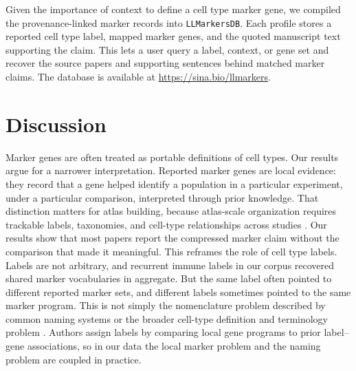 \documentclass[10pt,twocolumn]{article}
\theoremstyle{plain}
\theoremstyle{definition}
\theoremstyle{remark}
\begin{document}
Given the importance of context to define a cell type marker gene, we compiled the provenance-linked marker records into \texttt{LLMarkersDB}.  Each profile stores a reported cell type label, mapped marker genes, and the quoted manuscript text supporting the claim.  This lets a user query a label, context, or gene set and recover the source papers and supporting sentences behind matched marker claims. The database is available at \href{https://sina.bio/llmarkers}{https://sina.bio/llmarkers}.

\section{Discussion}

Marker genes are often treated as portable definitions of cell types. Our results argue for a narrower interpretation. Reported marker genes are local evidence: they record that a gene helped identify a population in a particular experiment, under a particular comparison, interpreted through prior knowledge. That distinction matters for atlas building, because atlas-scale organization requires trackable labels, taxonomies, and cell-type relationships across studies \citep{Miller2020CellNomenclature,Domcke2023ReferenceCellTree}. Our results show that most papers report the compressed marker claim without the comparison that made it meaningful.
\balance
This reframes the role of cell type labels. Labels are not arbitrary, and recurrent immune labels in our corpus recovered shared marker vocabularies in aggregate. But the same label often pointed to different reported marker sets, and different labels sometimes pointed to the same marker program. This is not simply the nomenclature problem described by common naming systems \citep{Miller2020CellNomenclature} or the broader cell-type definition and terminology problem \citep{Zeng2022CellType,Zhu2026RationalTerminology}. Authors assign labels by comparing local gene programs to prior label--gene associations, so in our data the local marker problem and the naming problem are coupled in practice.
\end{document}
